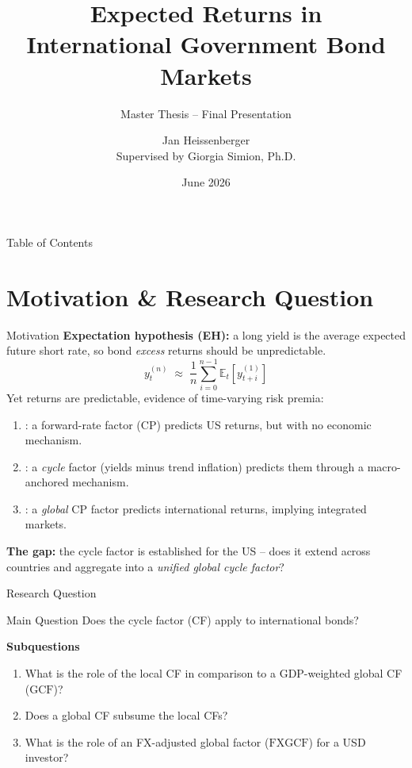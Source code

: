 \documentclass[10pt]{beamer}
\title[Exp. Returns in International Bond Markets]{Expected Returns in\\
  International Government Bond Markets}
\subtitle{Master Thesis -- Final Presentation}
\author[Jan Heissenberger]{Jan Heissenberger\\
  Supervised by Giorgia Simion, Ph.D.}
\date{June 2026} %
\newcommand{\GCF}{\mathrm{GCF}}
\newcommand{\FXGCF}{\mathrm{FXGCF}}
\newcommand{\E}{\mathbb{E}}          %
\begin{document}
\begin{frame}
  \titlepage
\end{frame}

\begin{frame}{Table of Contents}
  \tableofcontents
\end{frame}

\section{Motivation \& Research Question}

\begin{frame}{Motivation}
  \textbf{Expectation hypothesis (EH):} a long yield is the average expected
  future short rate, so bond \emph{excess} returns should be unpredictable.
  \begin{equation*}
    y^{(n)}_{t} \;\approx\; \frac{1}{n}\sum_{i=0}^{n-1}
      \E_{t}\!\left[y^{(1)}_{t+i}\right]
  \end{equation*}
  Yet returns are \alert{predictable}, evidence of time-varying risk premia:
  \begin{enumerate}
    \item \citet{cochrane2005}: a forward-rate factor (CP) predicts US returns,
      but with no economic mechanism.
    \item \citet{cieslak2015}: a \emph{cycle} factor (yields minus trend
      inflation) predicts them through a macro-anchored mechanism.
    \item \citet{dahlquist2013}: a \emph{global} CP factor predicts international
returns, implying integrated markets.
  \end{enumerate}
  \vfill
  \textbf{The gap:} the cycle factor is established for the US -- does it extend
  across countries and aggregate into a \emph{unified global cycle factor}?
  \citep[cf.][]{bauer2020,zhang2021}
\end{frame}

\begin{frame}{Research Question}
  \begin{block}{Main Question}
    Does the \citet{cieslak2015} cycle factor (CF) apply to international
    bonds?
  \end{block}
  \textbf{Subquestions}
  \begin{enumerate}
    \item What is the role of the local CF in comparison to a GDP-weighted
      global CF ($\GCF$)?
    \item Does a global CF subsume the local CFs?
    \item What is the role of an FX-adjusted global factor ($\FXGCF$) for a
      USD investor?
  \end{enumerate}
\end{frame}
\end{document}
